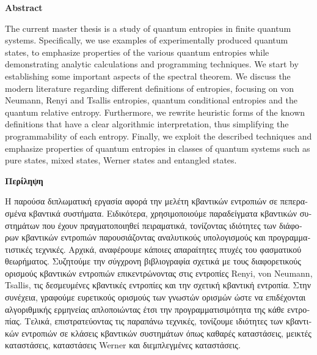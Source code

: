 \newpage
\thispagestyle{plain}

\vspace*{\fill}
\begin{center}
    \vspace{0.9cm}
    \textbf{Abstract}
\end{center}
The current master thesis is a study of quantum entropies in finite quantum systems. Specifically, we use examples of experimentally produced quantum states, to emphasize properties of the various quantum entropies while demonstrating analytic calculations and programming techniques. We start by establishing some important aspects of the spectral theorem. We discuss the modern literature regarding different definitions of entropies, focusing on von Neumann, Renyi and Tsallis entropies, quantum conditional entropies and the quantum relative entropy. Furthermore, we rewrite heuristic forms of the known definitions that have a clear algorithmic interpretation, thus simplifying the programmability of each entropy. Finally, we exploit the described techniques and emphasize properties of quantum entropies in classes of quantum systems such as pure states, mixed states, Werner states and entangled states. 
\vspace*{\fill}

\newpage
\vspace*{\fill}
\begin{center}
    \vspace{0.9cm}
\begin{otherlanguage}{greek}
\textbf{Περίληψη}
\end{otherlanguage}
\end{center}
\begin{otherlanguage}{greek}
Η παρούσα διπλωματική εργασία αφορά την μελέτη κβαντικών εντροπιών σε πεπερασμένα κβαντικά συστήματα. Ειδικότερα, χρησιμοποιούμε παραδείγματα κβαντικών συστημάτων που έχουν πραγματοποιηθεί πειραματικά, τονίζοντας ιδιότητες των διάφορων κβαντικών εντροπιών παρουσιάζοντας αναλυτικούς υπολογισμούς και προγραμματιστικές τεχνικές. Αρχικά, αναφέρουμε κάποιες απαραίτητες πτυχές του φασματικού θεωρήματος. Συζητούμε την σύγχρονη βιβλιογραφία σχετικά με τους διαφορετικούς ορισμούς κβαντικών εντροπιών επικεντρώνοντας στις εντροπίες \textlatin{Renyi, von Neumann, Tsallis}, τις δεσμευμένες κβαντικές εντροπίες και την σχετική κβαντική εντροπία. Στην συνέχεια, γραφούμε ευρετικούς ορισμούς των γνωστών ορισμών ώστε να επιδέχονται αλγοριθμικής ερμηνείας απλοποιώντας έτσι την προγραμματισιμότητα της κάθε εντροπίας. Τελικά, επιστρατεύοντας τις παραπάνω τεχνικές, τονίζουμε ιδιότητες των κβαντικών εντροπιών σε κλάσεις κβαντικών συστημάτων όπως καθαρές καταστάσεις, μεικτές καταστάσεις, καταστάσεις \textlatin{Werner} και διεμπλεγμένες καταστάσεις.
\end{otherlanguage}
\vspace*{\fill}
